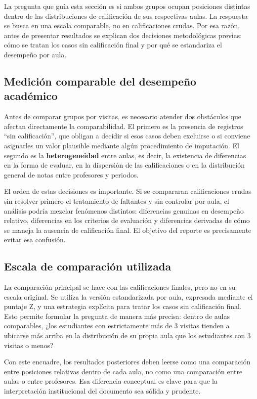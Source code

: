 \documentclass[10pt,letterpaper]{article} %
\numberwithin{figure}{subsection}
\begin{document}
La pregunta que guía esta sección es si ambos grupos ocupan posiciones distintas dentro de las distribuciones de calificación de sus respectivas aulas. La respuesta se busca en una escala comparable, no en calificaciones crudas. Por esa razón, antes de presentar resultados se explican dos decisiones metodológicas previas: cómo se tratan los casos sin calificación final y por qué se estandariza el desempeño por aula.

\subsection{Medición comparable del desempeño académico}
Antes de comparar grupos por visitas, es necesario atender dos obstáculos que afectan directamente la comparabilidad. El primero es la presencia de registros ``sin calificación'', que obligan a decidir si esos casos deben excluirse o si conviene asignarles un valor plausible mediante algún procedimiento de imputación. El segundo es la \textbf{heterogeneidad} entre aulas, es decir, la existencia de diferencias en la forma de evaluar, en la dispersión de las calificaciones o en la distribución general de notas entre profesores y periodos.

El orden de estas decisiones es importante. Si se compararan calificaciones crudas sin resolver primero el tratamiento de faltantes y sin controlar por aula, el análisis podría mezclar fenómenos distintos: diferencias genuinas en desempeño relativo, diferencias en los criterios de evaluación y diferencias derivadas de cómo se maneja la ausencia de calificación final. El objetivo del reporte es precisamente evitar esa confusión.

\subsection{Escala de comparación utilizada}
La comparación principal se hace con las calificaciones finales, pero no en su escala original. Se utiliza la versión estandarizada por aula, expresada mediante el puntaje Z, y una estrategia explícita para tratar los casos sin calificación final. Esto permite formular la pregunta de manera más precisa: dentro de aulas comparables, ¿los estudiantes con estrictamente más de 3 visitas tienden a ubicarse más arriba en la distribución de su propia aula que los estudiantes con 3 visitas o menos?

Con este encuadre, los resultados posteriores deben leerse como una comparación entre posiciones relativas dentro de cada aula, no como una comparación entre aulas o entre profesores. Esa diferencia conceptual es clave para que la interpretación institucional del documento sea sólida y prudente.
\end{document}
